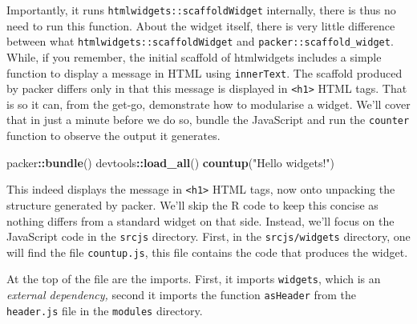 \documentclass[
]{krantz}
\makeatletter
\newenvironment{Shaded}{\begin{snugshade}}{\end{snugshade}}
\newcommand{\KeywordTok}[1]{\textcolor[rgb]{0.27,0.27,0.27}{\textbf{#1}}}
\newcommand{\NormalTok}[1]{#1}
\newcommand{\OperatorTok}[1]{\textcolor[rgb]{0.43,0.43,0.43}{\textbf{#1}}}
\newcommand{\StringTok}[1]{\textcolor[rgb]{0.5,0.5,0.5}{#1}}
\newenvironment{kframe}{%
\medskip{}
\setlength{\fboxsep}{.8em}
 \def\at@end@of@kframe{}%
 \ifinner\ifhmode%
  \def\at@end@of@kframe{\end{minipage}}%
  \begin{minipage}{\columnwidth}%
 \fi\fi%
 \def\FrameCommand##1{\hskip\@totalleftmargin \hskip-\fboxsep
 \colorbox{shadecolor}{##1}\hskip-\fboxsep
     \hskip-\linewidth \hskip-\@totalleftmargin \hskip\columnwidth}%
 \MakeFramed {\advance\hsize-\width
   \@totalleftmargin\z@ \linewidth\hsize
   \@setminipage}}%
 {\par\unskip\endMakeFramed%
 \at@end@of@kframe}
\renewenvironment{Shaded}{\begin{kframe}}{\end{kframe}}
\makeatother
\begin{document}
Importantly, it runs \texttt{htmlwidgets::scaffoldWidget} internally, there is thus no need to run this function. About the widget itself, there is very little difference between what \texttt{htmlwidgets::scaffoldWidget} and \texttt{packer::scaffold\_widget}. While, if you remember, the initial scaffold of htmlwidgets includes a simple function to display a message in HTML using \texttt{innerText}. The scaffold produced by packer differs only in that this message is displayed in \texttt{\textless{}h1\textgreater{}} HTML tags. That is so it can, from the get-go, demonstrate how to modularise a widget. We'll cover that in just a minute before we do so, bundle the JavaScript and run the \texttt{counter} function to observe the output it generates.

\begin{Shaded}
\begin{Highlighting}[]
\NormalTok{packer}\OperatorTok{::}\KeywordTok{bundle}\NormalTok{()}
\NormalTok{devtools}\OperatorTok{::}\KeywordTok{load\_all}\NormalTok{()}
\KeywordTok{countup}\NormalTok{(}\StringTok{"Hello widgets!"}\NormalTok{)}
\end{Highlighting}
\end{Shaded}

This indeed displays the message in \texttt{\textless{}h1\textgreater{}} HTML tags, now onto unpacking the structure generated by packer. We'll skip the R code to keep this concise as nothing differs from a standard widget on that side. Instead, we'll focus on the JavaScript code in the \texttt{srcjs} directory. First, in the \texttt{srcjs/widgets} directory, one will find the file \texttt{countup.js}, this file contains the code that produces the widget.

At the top of the file are the imports. First, it imports \texttt{widgets}, which is an \emph{external dependency,} second it imports the function \texttt{asHeader} from the \texttt{header.js} file in the \texttt{modules} directory.
\end{document}
